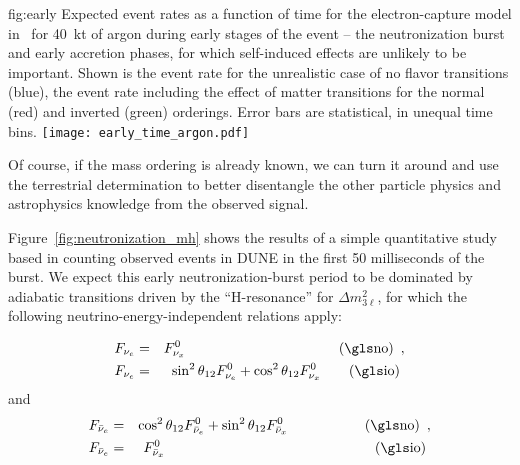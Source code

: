 \begin{dunefigure}{fig:early}
{Expected event rates as a function of time for the electron-capture model in~\cite{Huedepohl:2009wh} for \SI{40}{kt} of argon during early stages of the event -- the neutronization burst and early accretion phases, for which self-induced effects are unlikely to be important.  Shown is the event rate for the unrealistic case of no flavor transitions (blue), the event rate including the effect of matter transitions for the normal (red)  and inverted (green) orderings.  Error bars are statistical, in unequal time bins.}
\texttt{[image: early\_time\_argon.pdf]}
\end{dunefigure}

Of course, if the mass ordering is already known, we can turn it around 
and use the terrestrial determination to better disentangle the other 
particle physics and astrophysics knowledge from the observed signal.




Figure~\ref{fig:neutronization_mh} shows the results of a simple quantitative study
based in counting observed events in DUNE in the first 50 milliseconds
of the burst.  We expect this early neutronization-burst period to be
dominated by adiabatic  transitions driven by the ``H-resonance''
for $\Delta m^2_{3\ell}$, for which the following
neutrino-energy-independent relations apply:

\begin{eqnarray}  
 F_{\nu_e} &=& F^0_{\nu_x} \,\ \,\ \,\ \,\ \,\ \,\ \,\ \,\  \,\ \,\ \,\ \,\   \,\ \,\  \,\ \,\ \,\ \,\ \,\ \,\  \,\ \,\ \textrm{(\dword{no})} \,\ , \label{eq:msw_nmo}\\
 F_{\nu_e} &=&  \sin^2 \theta_{12} F^0_{\nu_e} +
\cos^2 \theta_{12} F^0_{\nu_x}  \,\ \,\ \,\ \,\ \textrm{(\dword{io})} \,\,
\label{eq:msw_imo}
\end{eqnarray} 
 and 
\begin{eqnarray}  
 F_{\bar\nu_e} &=& \cos^2 \theta_{12} F^0_{\bar\nu_e} + \sin^2 \theta_{12} F^0_{\bar\nu_x}   \,\   \,\ \,\  \,\ \,\ \,\ \,\ \,\ \,\  \,\ \,\ \textrm{(\dword{no})} \,\ , \label{eq:msw_nmo_anti}\\
 F_{\bar\nu_e} &=&   F^0_{\bar\nu_x}  \,\ \,\ \,\ \,\ \,\ \,\ \,\ \,\ \,\ \,\ \,\ \,\ \,\ \,\ \,\ \,\ 
 \,\ \,\ \,\ \,\ \,\ \,\ \,\ \,\ \,\ \,\ \,\ \,\ \,\  \,\
\textrm{(\dword{io})} \,\,\label{eq:msw_imo_anti}
\end{eqnarray} 

